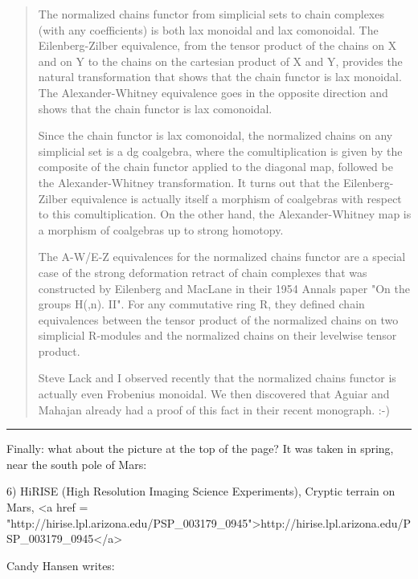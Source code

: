 \begin{quote}

    The normalized chains functor from simplicial sets to chain
    complexes (with any coefficients) is both lax monoidal and lax
    comonoidal.  The Eilenberg-Zilber equivalence, from the tensor
    product of the chains on X and on Y to the chains on the cartesian
    product of X and Y, provides the natural transformation that shows
    that the chain functor is lax monoidal. The Alexander-Whitney
    equivalence goes in the opposite direction and shows that the chain
    functor is lax comonoidal.

    Since the chain functor is lax comonoidal, the normalized chains on
    any simplicial set is a dg coalgebra, where the comultiplication is
    given by the composite of the chain functor applied to the diagonal
    map, followed be the Alexander-Whitney transformation.  It turns
    out that the Eilenberg-Zilber equivalence is actually itself a
    morphism of coalgebras with respect to this comultiplication.  On
    the other hand, the Alexander-Whitney map is a morphism of
    coalgebras up to strong homotopy.

    The A-W/E-Z equivalences for the normalized chains functor are a
    special case of the strong deformation retract of chain complexes
    that was constructed by Eilenberg and MacLane in their 1954 Annals
    paper "On the groups H(\pi ,n). II".  For any commutative
    ring R, they defined chain equivalences between the tensor
    product of the normalized chains on two simplicial R-modules and
    the normalized chains on their levelwise tensor product.

    Steve Lack and I observed recently that the normalized chains
    functor is actually even Frobenius monoidal.  We then discovered
    that Aguiar and Mahajan already had a proof of this fact in their
    recent monograph. :-)

 \end{quote}

\par\noindent\rule{\textwidth}{0.4pt}

Finally: what about the picture at the top of the page?  It was taken
in spring, near the south pole of Mars:

6) HiRISE (High Resolution Imaging Science Experiments), Cryptic
terrain on Mars, <a href = "http://hirise.lpl.arizona.edu/PSP_003179_0945">http://hirise.lpl.arizona.edu/PSP_003179_0945</a>

Candy Hansen writes:

